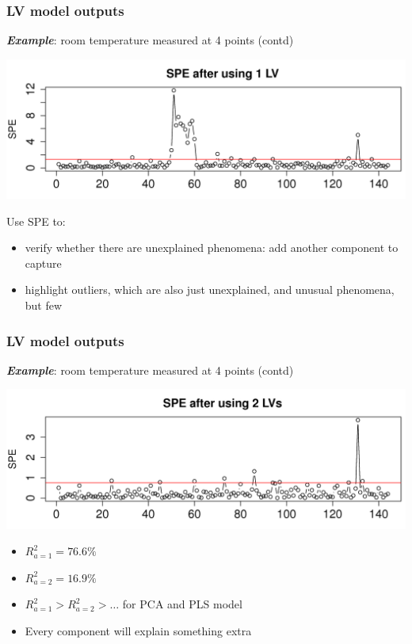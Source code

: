 \begin{frame}\frametitle{LV model outputs}

	\textbf{\emph{Example}}: room temperature measured at 4 points (contd)
	
	\begin{center}
		\includegraphics[width=\textwidth]{images/temperatures-SPE-after-one-PC.png}
	\end{center}

	Use SPE to:
	\begin{itemize}
		\item	verify whether there are unexplained phenomena: add another component to capture
		
		\item	highlight outliers, which are also just unexplained, and unusual phenomena, but few
	\end{itemize}
	
\end{frame}

\begin{frame}\frametitle{LV model outputs}

	\textbf{\emph{Example}}: room temperature measured at 4 points (contd)
	
	\begin{center}
		\includegraphics[width=\textwidth]{images/temperatures-SPE-after-two-LV.png}
	\end{center}

	\begin{itemize}
		\item	\( R^2_{a=1} = 76.6\% \)
		
		\item	\( R^2_{a=2} = 16.9\% \)
		
		\item	\( R^2_{a=1} > R^2_{a=2} > \ldots \) for PCA and PLS model
		
		\item	Every component will explain something extra
	\end{itemize}
\end{frame}

